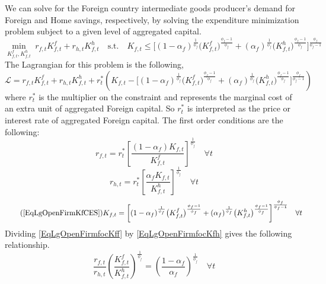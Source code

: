 \documentclass[letterpaper,12pt]{article}
\theoremstyle{definition}
\begin{document}
    We can solve for the Foreign country intermediate goods producer's demand for Foreign and Home savings, respectively, by solving the expenditure minimization problem subject to a given level of aggregated capital.
    \begin{equation}\label{EqLgOpenFirmMinProbF}
      \min_{K^f_{f,t},K^h_{f,t}} \: r_{f,t} K^f_{f,t} + r_{h,t}K^h_{f,t} \quad \text{s.t.} \quad K_{f,t} \leq \biggl[(1 - \alpha_f)^\frac{1}{\phi_f}\bigl(K^f_{f,t}\bigr)^\frac{\phi_f-1}{\phi_f} + (\alpha_f)^\frac{1}{\phi_f}\bigl(K^h_{f,t}\bigr)^\frac{\phi_f-1}{\phi_f}\biggr]^\frac{\phi_f}{\phi_f-1}
    \end{equation}
    The Lagrangian for this problem is the following,
    \begin{equation}\label{EqLgOpenFirmlagrF}
      \mathcal{L} = r_{f,t}K^f_{f,t} + r_{h,t}K^h_{f,t} + r^*_t\left(K_{f,t} - \biggl[(1 - \alpha_f)^\frac{1}{\phi_f}\bigl(K^f_{f,t}\bigr)^\frac{\phi_f-1}{\phi_f} + (\alpha_f)^\frac{1}{\phi_f}\bigl(K^h_{f,t}\bigr)^\frac{\phi_f-1}{\phi_f}\biggr]^\frac{\phi_f}{\phi_f-1}\right)
    \end{equation}
    where $r^*_t$ is the multiplier on the constraint and represents the marginal cost of an extra unit of aggregated Foreign capital. So $r^*_t$ is interpreted as the price or interest rate of aggregated Foreign capital. The first order conditions are the following:
    \begin{equation}\label{EqLgOpenFirmfocKff}
      r_{f,t} = r^*_t\left[\frac{(1-\alpha_f)K_{f,t}}{K^f_{f,t}}\right]^{\frac{1}{\phi_f}} \quad\forall t
    \end{equation}
    \begin{equation}\label{EqLgOpenFirmfocKfh}
      r_{h,t} = r^*_t\left[\frac{\alpha_f K_{f,t}}{K^h_{f,t}}\right]^{\frac{1}{\phi_f}} \quad\forall t
    \end{equation}
    \begin{equation}\tag{\ref{EqLgOpenFirmKfCES}}
      K_{f,t}= \biggl[(1 - \alpha_f)^\frac{1}{\phi_f}\bigl(K^f_{f,t}\bigr)^\frac{\phi_f-1}{\phi_f} + (\alpha_f)^\frac{1}{\phi_f}\bigl(K^h_{f,t}\bigr)^\frac{\phi_f-1}{\phi_f}\biggr]^\frac{\phi_f}{\phi_f-1} \quad\forall t
    \end{equation}
    Dividing \eqref{EqLgOpenFirmfocKff} by \eqref{EqLgOpenFirmfocKfh} gives the following relationship.
    \begin{equation}\label{EqLgOpenFirmFracCapForDom}
      \frac{r_{f,t}}{ r_{h,t}}\left(\frac{K^f_{f,t}}{K^h_{f,t}}\right)^{\frac{1}{\phi_f}} = \left(\frac{1-\alpha_f}{\alpha_f}\right)^{\frac{1}{\phi_f}} \quad\forall t
    \end{equation}
\end{document}
